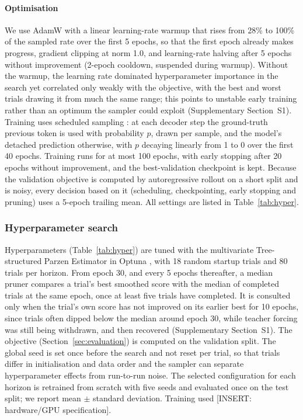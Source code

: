 \paragraph{Optimisation}
We use AdamW \citep{loshchilov2019adamw} with a linear learning-rate warmup that rises from 28\% to 100\% of the sampled rate over the first 5 epochs, so that the first epoch already makes progress, gradient clipping at norm 1.0, and learning-rate halving after 5 epochs without improvement (2-epoch cooldown, suspended during warmup). Without the warmup, the learning rate dominated hyperparameter importance in the search yet correlated only weakly with the objective, with the best and worst trials drawing it from much the same range; this points to unstable early training rather than an optimum the sampler could exploit (Supplementary Section~S1). Training uses scheduled sampling \citep{bengio2015scheduledsampling}: at each decoder step the ground-truth previous token is used with probability $p$, drawn per sample, and the model's detached prediction otherwise, with $p$ decaying linearly from 1 to 0 over the first 40 epochs. Training runs for at most 100 epochs, with early stopping after 20 epochs without improvement, and the best-validation checkpoint is kept. Because the validation objective is computed by autoregressive rollout on a short split and is noisy, every decision based on it (scheduling, checkpointing, early stopping and pruning) uses a 5-epoch trailing mean. All settings are listed in Table~\ref{tab:hyper}.

\subsubsection{Hyperparameter search}
\label{sec:hpo}

Hyperparameters (Table~\ref{tab:hyper}) are tuned with the multivariate Tree-structured Parzen Estimator \citep{bergstra2011tpe} in Optuna \citep{akiba2019optuna}, with 18 random startup trials and 80 trials per horizon. From epoch 30, and every 5 epochs thereafter, a median pruner compares a trial's best smoothed score with the median of completed trials at the same epoch, once at least five trials have completed. It is consulted only when the trial's own score has not improved on its earlier best for 10 epochs, since trials often dipped below the median around epoch 30, while teacher forcing was still being withdrawn, and then recovered (Supplementary Section~S1). The objective (Section~\ref{sec:evaluation}) is computed on the validation split.
The global seed is set once before the search and not reset per trial, so that trials differ in initialisation and data order and the sampler can separate hyperparameter effects from run-to-run noise. The selected configuration for each horizon is retrained from scratch with five seeds and evaluated once on the test split; we report mean $\pm$ standard deviation. Training used [INSERT: hardware/GPU specification].

